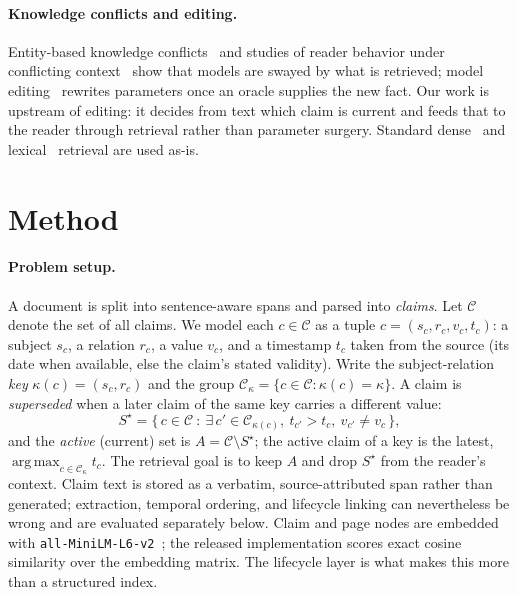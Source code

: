 \documentclass[letterpaper]{article}
\theoremstyle{plain}
\DeclareMathOperator*{\argmax}{arg\,max}
\begin{document}
\paragraph{Knowledge conflicts and editing.} Entity-based knowledge conflicts~\citep{longpre2021conflicts} and studies of reader behavior under conflicting context~\citep{xie2024conflict,liu2023lostmiddle} show that models are swayed by what is retrieved; model editing~\citep{decao2021editing,meng2022rome} rewrites parameters once an oracle supplies the new fact. Our work is upstream of editing: it decides from text which claim is current and feeds that to the reader through retrieval rather than parameter surgery. Standard dense~\citep{karpukhin2020dpr,reimers2019sbert} and lexical~\citep{robertson1995bm25} retrieval are used as-is.

\section{Method}
\label{sec:method}

\paragraph{Problem setup.} A document is split into sentence-aware spans and parsed into \emph{claims}. Let $\mathcal{C}$ denote the set of all claims. We model each $c\in\mathcal{C}$ as a tuple $c=(s_c, r_c, v_c, t_c)$: a subject $s_c$, a relation $r_c$, a value $v_c$, and a timestamp $t_c$ taken from the source (its date when available, else the claim's stated validity). Write the subject-relation \emph{key} $\kappa(c)=(s_c,r_c)$ and the group $\mathcal{C}_\kappa=\{c\in\mathcal{C}:\kappa(c)=\kappa\}$. A claim is \emph{superseded} when a later claim of the same key carries a different value:
\begin{equation}
\label{eq:super}
S^\star=\bigl\{\,c\in\mathcal{C}\ :\ \exists\,c'\in\mathcal{C}_{\kappa(c)},\ t_{c'}>t_c,\ v_{c'}\neq v_c\,\bigr\},
\end{equation}
and the \emph{active} (current) set is $A=\mathcal{C}\setminus S^\star$; the active claim of a key is the latest, $\argmax_{c\in\mathcal{C}_\kappa} t_c$. The retrieval goal is to keep $A$ and drop $S^\star$ from the reader's context. Claim text is stored as a verbatim, source-attributed span rather than generated; extraction, temporal ordering, and lifecycle linking can nevertheless be wrong and are evaluated separately below. Claim and page nodes are embedded with \texttt{all-MiniLM-L6-v2}~\citep{reimers2019sbert}; the released implementation scores exact cosine similarity over the embedding matrix. The lifecycle layer is what makes this more than a structured index.
\end{document}

